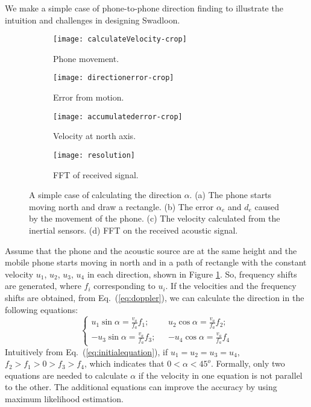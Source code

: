 \documentclass[]{sig-alternate-10pt}
\newcommand{\eqqref}[1]{Eq.~(\ref{#1})}
\def \ourprotocol{Swadloon\xspace}
\begin{document}
We make a simple case of phone-to-phone direction finding to
illustrate the intuition and challenges in designing \ourprotocol.
\begin{figure*}[t]
    \begin{center}
        \begin{subfigure}[t]{0.24\textwidth}
            \texttt{[image: calculateVelocity-crop]}
            \caption{Phone movement.}
            \label{fig:simplemovement}
        \end{subfigure}
        \begin{subfigure}[t]{0.22\textwidth}
            \texttt{[image: directionerror-crop]}
            \caption{Error from motion.}
            \label{fig:directionerror}
        \end{subfigure}
        \begin{subfigure}[t]{0.2\textwidth}
            \texttt{[image: accumulatederror-crop]}
            \caption{Velocity at north axis.}
            \label{fig:accumlateerror}
        \end{subfigure}
        \begin{subfigure}[t]{0.3\textwidth}
            \texttt{[image: resolution]}
            \caption{FFT of received signal.}
            \label{fig:fftresolution}
        \end{subfigure}
        \caption{A simple case of calculating the direction $\alpha$.
            (a) The phone starts moving  north and draw a rectangle. (b) The error $\alpha_e$ and $d_e$ caused by the movement of the phone. (c)
            The velocity calculated from the inertial sensors. (d) FFT on the
        received acoustic signal.}
        \label{fig:asimplecase}
    \end{center}
\end{figure*}





Assume that the phone and the acoustic source are
at the same height and the mobile phone starts moving in north and in
a path of rectangle with the constant velocity $u_{1}$, $u_{2}$,
$u_{3}$, $u_{4}$ in each direction, shown in Figure
\ref{fig:simplemovement}. So, frequency shifts are generated, where
$f_i$ corresponding to $u_i$.  If the velocities and the frequency  
shifts are obtained, from \eqqref{eq:doppler}, we can calculate the direction in the following
equations:
\begin{equation}
    \begin{cases}
        u_{1}\sin\alpha  =\frac{v_{a}}{f_{a}}f_{1}; \ \ \
        & u_{2}\cos\alpha  =\frac{v_{a}}{f_{a}}f_{2};\\
        -u_{3}\sin\alpha  =\frac{v_{a}}{f_{a}}f_{3}; \ \ \
        & -u_{4}\cos\alpha  =\frac{v_{a}}{f_{a}}f_{4}
    \end{cases}\label{eq:initialequation}
\end{equation}
Intuitively from \eqqref{eq:initialequation}, if $u_1=u_2=u_3=u_4$,
$f_2>f_1>0>f_3>f_4$,
which indicates that $0<\alpha<45^o$. Formally, only two equations
are needed to calculate $\alpha$ if the velocity in one equation is
not parallel to the other. The additional equations can improve the
accuracy by using maximum likelihood estimation.
\end{document}
